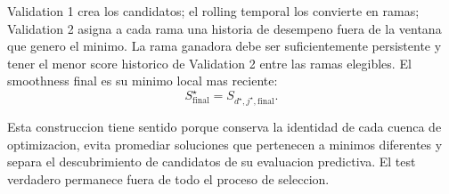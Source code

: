 \documentclass[11pt]{article}
\begin{document}
Validation 1 crea los candidatos; el rolling temporal los convierte en ramas;
Validation 2 asigna a cada rama una historia de desempeno fuera de la ventana
que genero el minimo. La rama ganadora debe ser suficientemente persistente y
tener el menor score historico de Validation 2 entre las ramas elegibles. El
smoothness final es su minimo local mas reciente:
\[
\boxed{
S_{\mathrm{final}}^\star
=
S_{d^\star,j^\star,\mathrm{final}}.
}
\]

Esta construccion tiene sentido porque conserva la identidad de cada cuenca de
optimizacion, evita promediar soluciones que pertenecen a minimos diferentes y
separa el descubrimiento de candidatos de su evaluacion predictiva. El test
verdadero permanece fuera de todo el proceso de seleccion.
\end{document}
